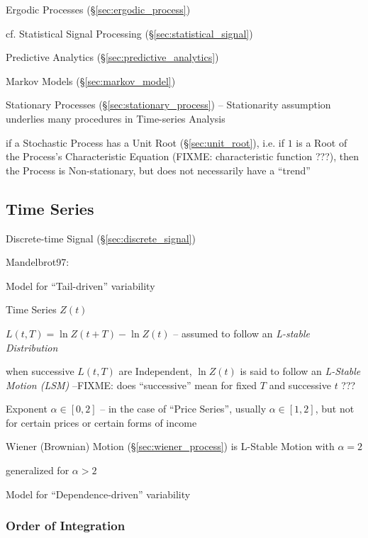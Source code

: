 Ergodic Processes (\S\ref{sec:ergodic_process})

\fist cf. Statistical Signal Processing (\S\ref{sec:statistical_signal})

Predictive Analytics (\S\ref{sec:predictive_analytics})

\fist Markov Models (\S\ref{sec:markov_model})

Stationary Processes (\S\ref{sec:stationary_process}) -- Stationarity assumption
underlies many procedures in Time-series Analysis

if a Stochastic Process has a Unit Root (\S\ref{sec:unit_root}), i.e. if $1$ is
a Root of the Process's Characteristic Equation (FIXME: characteristic function
???), then the Process is Non-stationary, but does not necessarily have a
``trend''



\subsection{Time Series}\label{sec:time_series}

Discrete-time Signal (\S\ref{sec:discrete_signal})

Mandelbrot97:


Model for ``Tail-driven'' variability

Time Series $Z(t)$

$L(t, T) = \ln Z(t+T) - \ln Z(t)$ -- assumed to follow an \emph{L-stable
  Distribution}

when successive $L(t, T)$ are Independent, $\ln Z(t)$ is said to follow an
\emph{L-Stable Motion (LSM)} --FIXME: does ``successive'' mean for fixed $T$ and
successive $t$ ???

Exponent $\alpha \in [0, 2]$ -- in the case of ``Price Series'', usually
$\alpha \in [1, 2]$, but not for certain prices or certain forms of income

Wiener (Brownian) Motion (\S\ref{sec:wiener_process}) is L-Stable Motion with
$\alpha = 2$

generalized for $\alpha > 2$

Model for ``Dependence-driven'' variability



\subsubsection{Order of Integration}\label{sec:order_of_integration}

